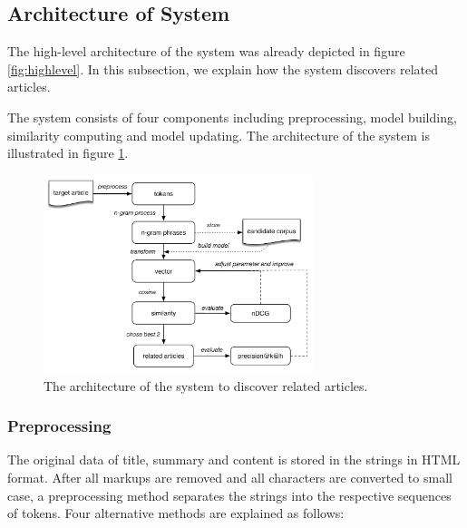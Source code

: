 \begin{description}
\label{tab:def_terms}
\end{description}

\bigbreak

\subsection{Architecture of System}
\label{sec:4.3}

The high-level architecture of the system was already depicted in figure \ref{fig:highlevel}. In this subsection, we explain how the system discovers related articles. 

The system consists of four components including preprocessing, model building, similarity computing and model updating. The architecture of the system is illustrated in figure \ref{fig:unsupervised}. 

\begin{figure}[!htb]
    \centering
    \includegraphics[width=0.7\textwidth]{fig/unsupervise}
    \caption{The architecture of the system to discover related articles.}
    \label{fig:unsupervised}
\end{figure}

\subsubsection{Preprocessing}
The original data of title, summary and content is stored in the strings in HTML format. After all markups are removed and all characters are converted to small case, a preprocessing method separates the strings into the respective sequences of tokens. Four alternative methods are explained as follows:

